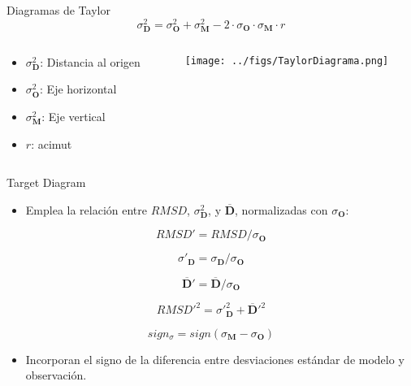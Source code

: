 \documentclass[aspectratio=169, usenames,svgnames,dvipsnames]{beamer}
\begin{document}
\begin{frame}[label={sec:org0df6d3a}]{Diagramas de Taylor}
\[
\sigma^2_{\mathbf{D}} = \sigma^2_{\mathbf{O}}  + \sigma^2_{\mathbf{M}}
- 2 \cdot \sigma_{\mathbf{O}} \cdot \sigma_{\mathbf{M}} \cdot r 
\]

\begin{columns}
\begin{column}{0.4\columnwidth}
\begin{itemize}
\item \(\sigma^2_{\mathbf{D}}\): Distancia al origen
\item \(\sigma^2_{\mathbf{O}}\): Eje horizontal
\item \(\sigma^2_{\mathbf{M}}\): Eje vertical
\item \(r\): acimut
\end{itemize}
\end{column}

\begin{column}{0.7\columnwidth}
\begin{center}
\texttt{[image: ../figs/TaylorDiagrama.png]}
\end{center}
\end{column}
\end{columns}
\end{frame}


\begin{frame}[label={sec:orgaeececf}]{Target Diagram}
\begin{itemize}
\item Emplea la relación entre \(RMSD\), \(\sigma^2_{\mathbf{D}}\), y \(\overline{\mathbf{D}}\), normalizadas con \(\sigma_{\mathbf{O}}\):
\end{itemize}
\[
RMSD' = RMSD / \sigma_{\mathbf{O}}
\]

\[
  \sigma'_{\mathbf{D}} = \sigma_{\mathbf{D}} / \sigma_{\mathbf{O}} 
\]

\[
\overline{\mathbf{D}}' = \overline{\mathbf{D}} / \sigma_{\mathbf{O}}
\]

\[
RMSD'^2= \sigma'^2_{\mathbf{D}} + \overline{\mathbf{D}}'^2
\]

\[
sign_{\sigma} =  sign(\sigma_{\mathbf{M}} - \sigma_{\mathbf{O}} )
\]

\begin{itemize}
\item Incorporan el signo de la diferencia entre desviaciones estándar de modelo y observación.
\end{itemize}

\nocite{Jolliff.Kindle.ea2009}
\end{frame}
\end{document}
